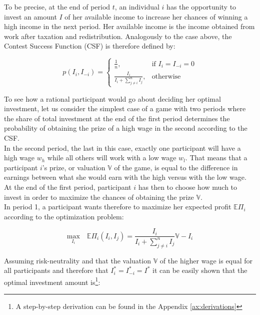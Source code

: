 To be precise, at the end of period $t$, an individual $i$ has the opportunity to invest an amount $I$ of her available income to increase her chances of winning a high income in the next period. Her available income is the income obtained from work after taxation and redistribution. Analogously to the case above, the Contest Success Function (CSF) is therefore defined by:

\begin{equation}
    p(I_i,I_{-i}) =
\begin{cases}
    \frac{1}{n},& \text{if } I_i = I_{-i} = 0\\
    \frac{I_i}{I_i + \sum_{j\neq i}^n I_{j}},              & \text{otherwise}
\end{cases}
\label{eq:csf}    
\end{equation}

\hfill \break

To see how a rational participant would go about deciding her optimal investment, let us consider the simplest case of a game with two periods where the share of total investment at the end of the first period determines the probability of obtaining the prize of a high wage in the second according to the CSF.\\

In the second period, the last in this case, exactly one participant will have a high wage $w_h$ while all others will work with a low wage $w_l$. That means that a participant $i$'s prize, or valuation $\mathbb{V}$ of the game, is equal to the difference in earnings between what she would earn with the high versus with the low wage. At the end of the first period, participant $i$ has then to choose how much to invest in order to maximize the chances of obtaining the prize $\mathbb{V}$.\\

In period 1, a participant wants therefore to maximize her expected profit $\mathbb{E}\Pi_i$ according to the optimization problem:

\begin{equation}
    \underset{I_i}{\text{max}}\quad\mathbb{E}\Pi_i(I_i,I_j) = \frac{I_i}{I_i + \sum_{j\neq i}^n I_{j}}\mathbb{V} - I_i
\label{eq:exp_util}
\end{equation}

Assuming risk-neutrality and that the valuation $\mathbb{V}$ of the higher wage is equal for all participants and therefore that $I_i^{*}=I_{-i}^{*}=I^{*}$ it can be easily shown that the optimal investment amount is\footnote{A step-by-step derivation can be found in the Appendix \ref{ax:derivations}}:

